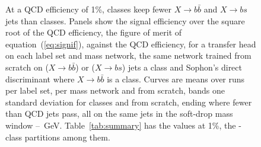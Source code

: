 \begin{figure}
\centering
{}
\caption{At a QCD efficiency of 1\%, \Kcoarse{} classes keep fewer $X\to b\bar b$ and $X\to bs$ jets than
\Kfull{} classes. Panels show the signal efficiency over the square root of the QCD efficiency, the figure of merit of
equation~(\ref{eq:signif}), against the QCD efficiency, for a transfer
head on each label set and mass network, the same network trained from scratch on
\MlstXbxScratchTrainBb{} ($X\to b\bar b$) or \MlstXbxScratchTrainBs{} ($X\to bs$) jets a class and
Sophon's direct discriminant where $X\to b\bar b$ is a class. Curves are
means over \MlstNRunsWord{} runs per label set, \MlstMassNRunsWord{} per mass network and
\MlstXbxScratchSeedsWord{} from scratch, bands one standard deviation for \Kfull{} classes and from scratch,
ending where fewer than \MlstMinBkgPass{} QCD jets pass, all on the same jets in the soft-drop mass window
\XbxWindowLo--\XbxWindowHi~GeV. Table~\ref{tab:summary} has the values at 1\%, the \Kcoarse-class partitions among
them.}
\label{fig:F11}
\end{figure}
